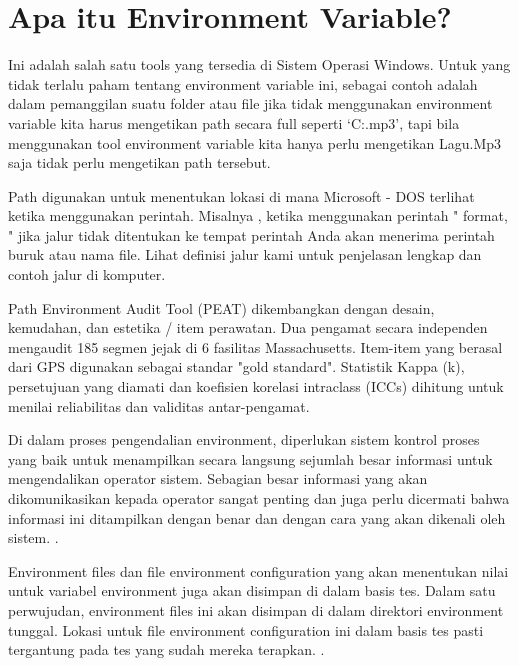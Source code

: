
\section {Apa itu Environment Variable?}
Ini adalah salah satu tools yang tersedia di Sistem Operasi Windows. Untuk yang tidak terlalu paham tentang environment variable ini, sebagai contoh adalah dalam pemanggilan suatu folder atau file jika tidak menggunakan environment variable kita harus mengetikan path secara full seperti `C:\Music\Lagu.mp3', tapi bila menggunakan tool environment variable kita hanya perlu mengetikan Lagu.Mp3 saja tidak perlu mengetikan path tersebut.

Path digunakan untuk menentukan lokasi di mana Microsoft - DOS terlihat ketika menggunakan perintah. Misalnya , ketika menggunakan perintah " format, " jika jalur tidak ditentukan ke tempat perintah Anda akan menerima perintah buruk atau nama file.  Lihat definisi jalur kami untuk penjelasan lengkap dan contoh jalur di komputer.

Path Environment Audit Tool (PEAT) dikembangkan dengan desain, kemudahan, dan estetika / item perawatan. Dua pengamat secara independen mengaudit 185 segmen jejak di 6 fasilitas Massachusetts. Item-item yang berasal dari GPS digunakan sebagai standar "gold standard". Statistik Kappa (k), persetujuan yang diamati dan koefisien korelasi intraclass (ICCs) dihitung untuk menilai reliabilitas dan validitas antar-pengamat.

Di dalam proses pengendalian environment, diperlukan sistem kontrol proses yang baik untuk menampilkan secara langsung sejumlah besar informasi untuk mengendalikan operator sistem. Sebagian besar informasi yang akan dikomunikasikan kepada operator sangat penting dan juga perlu dicermati bahwa informasi ini ditampilkan dengan benar dan dengan cara yang akan dikenali oleh sistem. \cite{kilgore1997directly}.

Environment files dan file environment configuration yang akan menentukan nilai untuk variabel environment juga akan disimpan di dalam basis tes. Dalam satu perwujudan, environment files ini akan disimpan di dalam direktori environment tunggal. Lokasi untuk file environment configuration ini dalam basis tes pasti tergantung pada tes yang sudah mereka terapkan. \cite{kilgore1997directly}.

